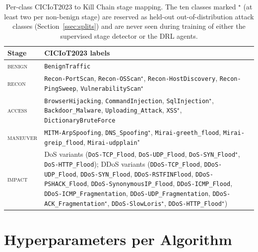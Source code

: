 \begin{table}[!htbp]
\centering
\caption[Per-class CICIoT2023-to-kill-chain mapping.]{Per-class CICIoT2023 to Kill Chain stage mapping. The ten classes marked $^\star$ (at least two per non-benign stage) are reserved as held-out out-of-distribution attack classes (Section~\ref{ssec:splits}) and are never seen during training of either the supervised stage detector or the DRL agents.}
\label{tab:kc_mapping}
\small
\begin{tabularx}{\textwidth}{lX}
\toprule
Stage & CICIoT2023 labels \\
\midrule
\textsc{benign}  & \texttt{BenignTraffic} \\
\addlinespace
\textsc{recon}   & \texttt{Recon-PortScan}, \texttt{Recon-OSScan}$^\star$, \texttt{Recon-HostDiscovery}, \texttt{Recon-PingSweep}, \texttt{VulnerabilityScan}$^\star$ \\
\addlinespace
\textsc{access}  & \texttt{BrowserHijacking}, \texttt{CommandInjection}, \texttt{SqlInjection}$^\star$, \texttt{Backdoor\_Malware}, \texttt{Uploading\_Attack}, \texttt{XSS}$^\star$, \texttt{DictionaryBruteForce} \\
\addlinespace
\textsc{maneuver} & \texttt{MITM-ArpSpoofing}, \texttt{DNS\_Spoofing}$^\star$, \texttt{Mirai-greeth\_flood}, \texttt{Mirai-greip\_flood}, \texttt{Mirai-udpplain}$^\star$ \\
\addlinespace
\textsc{impact}  & DoS variants (\texttt{DoS-TCP\_Flood}, \texttt{DoS-UDP\_Flood}, \texttt{DoS-SYN\_Flood}$^\star$, \texttt{DoS-HTTP\_Flood}); DDoS variants (\texttt{DDoS-TCP\_Flood}, \texttt{DDoS-UDP\_Flood}, \texttt{DDoS-SYN\_Flood}, \texttt{DDoS-RSTFINFlood}, \texttt{DDoS-PSHACK\_Flood}, \texttt{DDoS-SynonymousIP\_Flood}, \texttt{DDoS-ICMP\_Flood}, \texttt{DDoS-ICMP\_Fragmentation}, \texttt{DDoS-UDP\_Fragmentation}, \texttt{DDoS-ACK\_Fragmentation}$^\star$, \texttt{DDoS-SlowLoris}$^\star$, \texttt{DDoS-HTTP\_Flood}$^\star$) \\
\bottomrule
\end{tabularx}
\end{table}

\chapter{Hyperparameters per Algorithm}\label{app:hparams}

